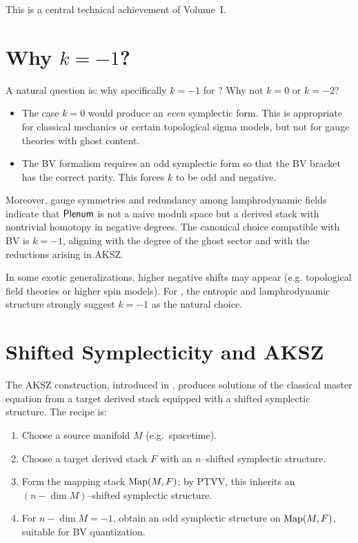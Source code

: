 This is a central technical achievement of Volume~I.

\section{Why \texorpdfstring{$k=-1$}{k = -1}?}

A natural question is: why specifically $k=-1$ for \rsvpabbr{}? Why not $k=0$
or $k=-2$?

\begin{itemize}
  \item The case $k=0$ would produce an \emph{even} symplectic form. This is
  appropriate for classical mechanics or certain topological sigma models, but
  not for gauge theories with ghost content.

  \item The BV formalism requires an odd symplectic form so that the BV bracket
  has the correct parity. This forces $k$ to be odd and negative.
\end{itemize}

Moreover, gauge symmetries and redundancy among lamphrodynamic fields indicate
that $\mathsf{Plenum}$ is not a naive moduli space but a derived stack with nontrivial
homotopy in negative degrees. The canonical choice compatible with BV is
$k=-1$, aligning with the degree of the ghost sector and with the reductions
arising in AKSZ.

\begin{remark}
In some exotic generalizations, higher negative shifts may appear (e.g.
topological field theories or higher spin models). For \rsvpabbr{}, the
entropic and lamphrodynamic structure strongly suggest $k=-1$ as the natural
choice.
\end{remark}

\section{Shifted Symplecticity and AKSZ}

The AKSZ construction, introduced in \cite{AKSZ}, produces solutions of the
classical master equation from a target derived stack equipped with a shifted
symplectic structure. The recipe is:
\begin{enumerate}
  \item Choose a source manifold $M$ (e.g.\ spacetime).
  \item Choose a target derived stack $F$ with an $n$--shifted symplectic
    structure.
  \item Form the mapping stack $\operatorname{Map}(M,F)$; by PTVV, this inherits an
    $(n-\dim M)$--shifted symplectic structure.
  \item For $n-\dim M = -1$, obtain an odd symplectic structure on
    $\operatorname{Map}(M,F)$, suitable for BV quantization.
\end{enumerate}

